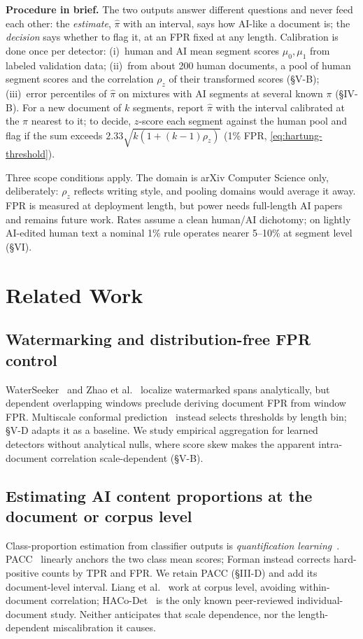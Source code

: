 \documentclass[10pt,conference,a4paper]{IEEEtran}
\newcommand{\sect}[1]{\S#1}
\begin{document}
\noindent\textbf{Procedure in brief.} The two outputs answer different questions and
never feed each other: the \emph{estimate}, $\hat{\pi}$ with an interval, says how
AI-like a document is; the \emph{decision} says whether to flag it, at an FPR fixed at
any length. Calibration is done once per detector: (i)~human and AI mean segment scores
$\mu_0,\mu_1$ from labeled validation data; (ii)~from about 200 human documents, a pool
of human segment scores and the correlation $\rho_z$ of their transformed scores
(\sect{V-B}); (iii)~error percentiles of $\hat{\pi}$ on mixtures with AI segments at
several known $\pi$ (\sect{IV-B}). For a new document of $k$ segments, report
$\hat{\pi}$ with the interval calibrated at the $\pi$ nearest to it; to decide,
$z$-score each segment against the human pool and flag if the sum exceeds
$2.33\sqrt{k(1+(k-1)\rho_z)}$ (1\% FPR, \eqref{eq:hartung-threshold}).

Three scope conditions apply. The domain is arXiv Computer Science only, deliberately:
$\rho_z$ reflects writing style, and pooling domains would average it away. FPR is
measured at deployment length, but power needs full-length AI papers and remains future
work. Rates assume a clean human/AI dichotomy; on lightly AI-edited human text a nominal
1\% rule operates nearer 5--10\% at segment level (\sect{VI}).

\section{Related Work}

\subsection{Watermarking and distribution-free FPR control}
WaterSeeker~\cite{waterseeker2025} and Zhao et al.~\cite{zhao2025acl} localize
watermarked spans analytically, but dependent overlapping windows preclude deriving
document FPR from window FPR. Multiscale conformal prediction~\cite{mcp2025acl} instead
selects thresholds by length bin; \sect{V-D} adapts it as a baseline. We study empirical
aggregation for learned detectors without analytical nulls, where score skew makes the
apparent intra-document correlation scale-dependent (\sect{V-B}).

\subsection{Estimating AI content proportions at the document or corpus level}
Class-proportion estimation from classifier outputs is \emph{quantification
learning}~\cite{forman2008,hopkinsking2010,gonzalez2017}. PACC~\cite{bella2010} linearly
anchors the two class mean scores; Forman instead corrects hard-positive counts by TPR
and FPR. We retain PACC (\sect{III-D}) and add its document-level interval. Liang et
al.~\cite{liang2024monitoring} work at corpus level, avoiding within-document
correlation; HACo-Det~\cite{haco2025} is the only known peer-reviewed individual-document
study. Neither anticipates that scale dependence, nor the length-dependent
miscalibration it causes.
\end{document}

